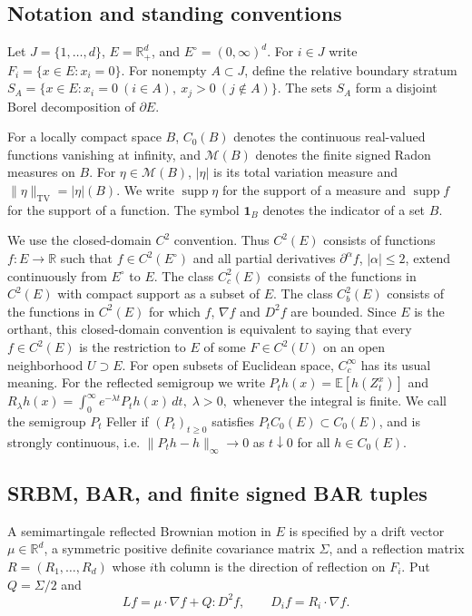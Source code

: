 \documentclass[aihp]{imsart}
\numberwithin{equation}{section}
\theoremstyle{plain}
\theoremstyle{definition}
\newcommand{\R}{\mathbb R}
\newcommand{\cM}{\mathcal M}
\newcommand{\supp}{\operatorname{supp}}
\newcommand{\TV}{\mathrm{TV}}
\newcommand{\1}{\mathbf 1}
\begin{document}
\subsection{Notation and standing conventions}\label{sec:notation}

Let $J=\{1,\ldots,d\}$, $E=\mathbb R_+^d$, and $E^\circ=(0,\infty)^d$.  For $i\in J$ write $ F_i=\{x\in E:x_i=0\}.$ For nonempty $A\subset J$, define the relative boundary stratum $ S_A=\{x\in E:x_i=0\ (i\in A),\ x_j>0\ (j\notin A)\}.$ The sets $S_A$ form a disjoint Borel decomposition of $\partial E$.

For a locally compact space $B$, $C_0(B)$ denotes the continuous real-valued functions vanishing at infinity, and $\cM(B)$ denotes the finite signed Radon measures on $B$.  For $\eta\in\cM(B)$, $|\eta|$ is its total variation measure and $\|\eta\|_{\TV}=|\eta|(B)$.  We write $\supp\eta$ for the support of a measure and $\supp f$ for the support of a function.  The symbol $\mathbf 1_B$ denotes the indicator of a set $B$.

We use the closed-domain $C^2$ convention.  Thus $C^2(E)$ consists of functions $f:E\to\R$ such that $f\in C^2(E^\circ)$ and all partial derivatives $\partial^\alpha f$, $|\alpha|\le2$, extend continuously from $E^\circ$ to $E$.  The class $C_c^2(E)$ consists of the functions in $C^2(E)$ with compact support as a subset of $E$.  The class $C_b^2(E)$ consists of the functions in $C^2(E)$ for which $f$, $\nabla f$ and $D^2f$ are bounded.  Since $E$ is the orthant, this closed-domain convention is equivalent to saying that every $f\in C^2(E)$ is the restriction to $E$ of some $F\in C^2(U)$ on an open neighborhood $U\supset E$.  For open subsets of Euclidean space, $C_c^\infty$ has its usual meaning. For the reflected semigroup we write $P_t h(x)=\mathbb E[h(Z_t^x)]$ and $ R_\lambda h(x)=\int_0^\infty e^{-\lambda t}P_t h(x)\,dt,\; \lambda>0,$ whenever the integral is finite.
We call the semigroup $P_t$ Feller if $(P_t)_{t\ge 0}$ satisfies $P_tC_0(E)\subset C_0(E)$, and is strongly continuous, i.e. $\|P_t h- h\|_\infty\to 0$ as $t\downarrow 0$ for all $h\in C_0(E)$.

\subsection{SRBM, BAR, and finite signed BAR tuples}

A semimartingale reflected Brownian motion in $E$ is specified by a drift vector $\mu\in\mathbb R^d$, a symmetric positive definite covariance matrix $\Sigma$, and a reflection matrix $R=(R_1,\ldots,R_d)$ whose $i$th column is the direction of reflection on $F_i$. Put $Q=\Sigma/2$ and
\[
 Lf=\mu\cdot\nabla f+Q:D^2f,
 \qquad
 D_i f=R_i\cdot\nabla f.
\]
\end{document}
